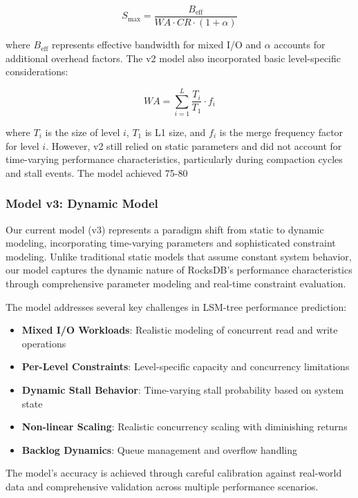\documentclass[11pt]{article}
\begin{document}
\begin{equation}
S_{\text{max}} = \frac{B_{\text{eff}}}{WA \cdot CR \cdot (1 + \alpha)}
\end{equation}

where $B_{\text{eff}}$ represents effective bandwidth for mixed I/O and $\alpha$ accounts for additional overhead factors. The v2 model also incorporated basic level-specific considerations:

\begin{equation}
WA = \sum_{i=1}^{L} \frac{T_i}{T_1} \cdot f_i
\end{equation}

where $T_i$ is the size of level $i$, $T_1$ is L1 size, and $f_i$ is the merge frequency factor for level $i$. However, v2 still relied on static parameters and did not account for time-varying performance characteristics, particularly during compaction cycles and stall events. The model achieved 75-80%

\subsubsection{Model v3: Dynamic Model}
Our current model (v3) represents a paradigm shift from static to dynamic modeling, incorporating time-varying parameters and sophisticated constraint modeling. Unlike traditional static models that assume constant system behavior, our model captures the dynamic nature of RocksDB's performance characteristics through comprehensive parameter modeling and real-time constraint evaluation.

The model addresses several key challenges in LSM-tree performance prediction:
\begin{itemize}
    \item \textbf{Mixed I/O Workloads}: Realistic modeling of concurrent read and write operations
    \item \textbf{Per-Level Constraints}: Level-specific capacity and concurrency limitations
    \item \textbf{Dynamic Stall Behavior}: Time-varying stall probability based on system state
    \item \textbf{Non-linear Scaling}: Realistic concurrency scaling with diminishing returns
    \item \textbf{Backlog Dynamics}: Queue management and overflow handling
\end{itemize}

The model's accuracy is achieved through careful calibration against real-world data and comprehensive validation across multiple performance scenarios.
\end{document}
